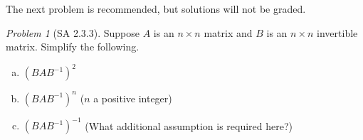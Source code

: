 \documentclass[fleqn,11pt]{paper}
\theoremstyle{remark}
\newtheorem*{prob}{Problem}
\newtheorem*{solution}{{\bf Solution}}
\newcommand{\<}{\ensuremath{\langle}}
\renewcommand{\>}{\ensuremath{\rangle}}
\begin{document}
\noindent The next problem is recommended, but solutions will not be graded.
\begin{prob}[SA 2.3.3]
Suppose $A$ is an $n \times n$ matrix and $B$ is an $n \times n$ invertible matrix.
  Simplify the following.
  \begin{enumerate}[a.]
  \item $(BAB^{-1})^2$
  \item $(BAB^{-1})^n$ ($n$ a positive integer)
  \item $(BAB^{-1})^{-1}$ (What additional assumption is required here?)
  \end{enumerate}
\end{prob}


% 
\end{document}
